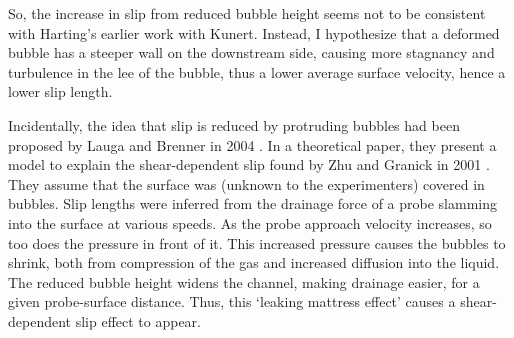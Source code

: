\documentclass[a4paper]{report}
\begin{document}
So, the increase in slip from reduced bubble height seems not to be consistent with Harting's earlier work with Kunert.  Instead, I hypothesize that a deformed bubble has a steeper wall on the downstream side, causing more stagnancy and turbulence in the lee of the bubble, thus a lower average surface velocity, hence a lower slip length.

\begin{center}
\end{center}


Incidentally, the idea that slip is reduced by protruding bubbles had been proposed by Lauga and Brenner in 2004 \cite{LaugaBrenner2004}.  In a theoretical paper, they present a model to explain the shear-dependent slip found by Zhu and Granick in 2001 \cite{ZhuGranick2001}.  They assume that the surface was (unknown to the experimenters) covered in bubbles.  Slip lengths were inferred from the drainage force of a probe slamming into the surface at various speeds. As the probe approach velocity increases, so too does the pressure in front of it.  This increased pressure causes the bubbles to shrink, both from compression of the gas and increased diffusion into the liquid.  The reduced bubble height widens the channel, making drainage easier, for a given probe-surface distance.  Thus, this `leaking mattress effect' causes a
\nopagebreak[0] shear-dependent slip effect to appear.

\vspace{3em}
\end{document}
